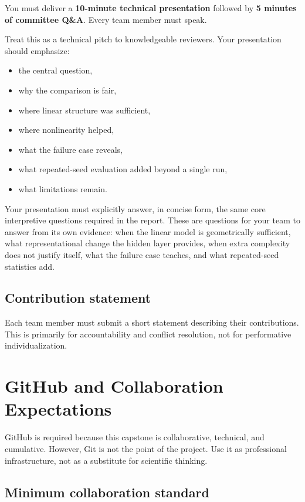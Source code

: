 \documentclass[11pt]{article}
\begin{document}
You must deliver a \textbf{10-minute technical presentation} followed by \textbf{5 minutes of committee Q\&A}. Every team member must speak.

Treat this as a technical pitch to knowledgeable reviewers. Your presentation should emphasize:

\begin{itemize}
    \item the central question,
    \item why the comparison is fair,
    \item where linear structure was sufficient,
    \item where nonlinearity helped,
    \item what the failure case reveals,
    \item what repeated-seed evaluation added beyond a single run,
    \item what limitations remain.
\end{itemize}

Your presentation must explicitly answer, in concise form, the same core interpretive questions required in the report. These are questions for your team to answer from its own evidence: when the linear model is geometrically sufficient, what representational change the hidden layer provides, when extra complexity does not justify itself, what the failure case teaches, and what repeated-seed statistics add.

\subsection{Contribution statement}

Each team member must submit a short statement describing their contributions. This is primarily for accountability and conflict resolution, not for performative individualization.

\section{GitHub and Collaboration Expectations}

GitHub is required because this capstone is collaborative, technical, and cumulative. However, Git is not the point of the project. Use it as professional infrastructure, not as a substitute for scientific thinking.

\subsection{Minimum collaboration standard}
\end{document}
